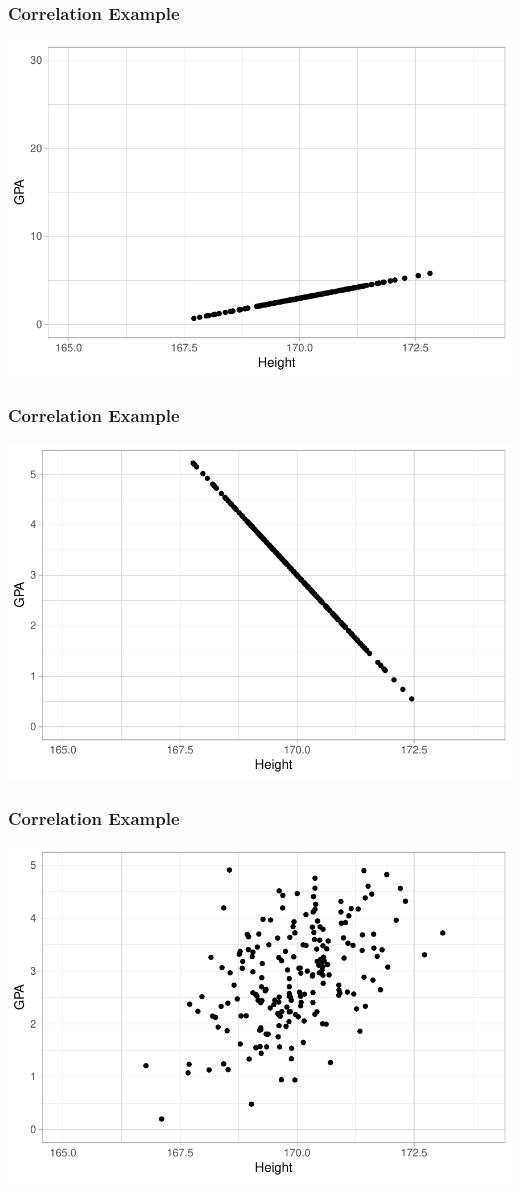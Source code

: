 \documentclass{beamer}
\begin{document}
\begin{frame} \frametitle{Correlation Example}
    \centering
    \includegraphics[width=0.8\linewidth]{../figs/class2/students_example1_stretched.pdf} \\[3mm]
\end{frame}

\begin{frame} \frametitle{Correlation Example}
    \centering
    \includegraphics[width=0.8\linewidth]{../figs/class2/students_example2.pdf} \\[3mm]
\end{frame}

\begin{frame} \frametitle{Correlation Example}
    \centering
    \includegraphics[width=0.8\linewidth]{../figs/class2/students_example3.pdf} \\[3mm]
\end{frame}
\end{document}
